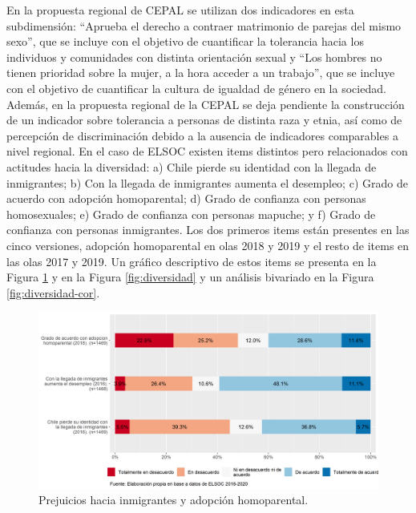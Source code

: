 \documentclass[
  12pt,
]{book}
\begin{document}
En la propuesta regional de CEPAL se utilizan dos indicadores en esta subdimensión: ``Aprueba el derecho a contraer matrimonio de parejas del mismo sexo'', que se incluye con el objetivo de cuantificar la tolerancia hacia los individuos y comunidades con distinta orientación sexual y ``Los hombres no tienen prioridad sobre la mujer, a la hora acceder a un trabajo'', que se incluye con el objetivo de cuantificar la cultura de igualdad de género en la sociedad. Además, en la propuesta regional de la CEPAL se deja pendiente la construcción de un indicador sobre tolerancia a personas de distinta raza y etnia, así como de percepción de discriminación debido a la ausencia de indicadores comparables a nivel regional. En el caso de ELSOC existen items distintos pero relacionados con actitudes hacia la diversidad: a) Chile pierde su identidad con la llegada de inmigrantes; b) Con la llegada de inmigrantes aumenta el desempleo; c) Grado de acuerdo con adopción homoparental; d) Grado de confianza con personas homosexuales; e) Grado de confianza con personas mapuche; y f) Grado de confianza con personas inmigrantes. Los dos primeros items están presentes en las cinco versiones, adopción homoparental en olas 2018 y 2019 y el resto de items en las olas 2017 y 2019. Un gráfico descriptivo de estos items se presenta en la Figura \ref{fig:prejuicios} y en la Figura \ref{fig:diversidad} y un análisis bivariado en la Figura \ref{fig:diversidad-cor}.

\begin{figure}[H]

{\centering \includegraphics[width=1\linewidth,height=1\textheight]{output/graphs/prejuicios} 

}

\caption{Prejuicios hacia inmigrantes y adopción homoparental.}\label{fig:prejuicios}
\end{figure}
\end{document}
